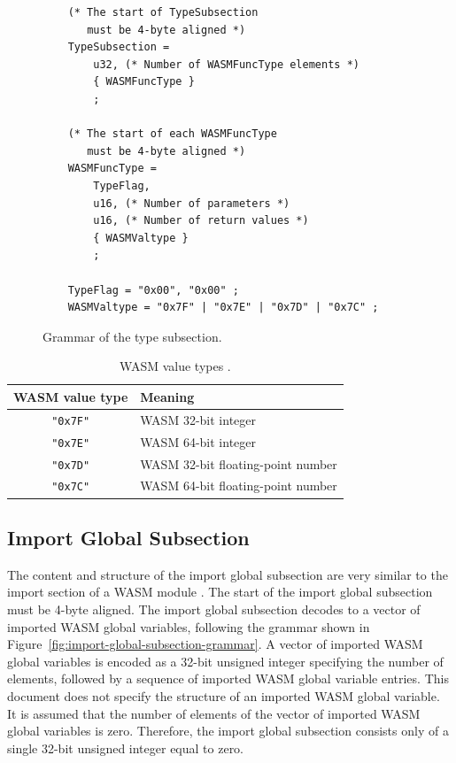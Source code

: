 \documentclass{article}
\begin{document}
\begin{figure}[H]
\begin{verbatim}
    (* The start of TypeSubsection
       must be 4-byte aligned *)
    TypeSubsection =
        u32, (* Number of WASMFuncType elements *)
        { WASMFuncType }
        ;

    (* The start of each WASMFuncType
       must be 4-byte aligned *)
    WASMFuncType =
        TypeFlag,
        u16, (* Number of parameters *)
        u16, (* Number of return values *)
        { WASMValtype }
        ;

    TypeFlag = "0x00", "0x00" ;
    WASMValtype = "0x7F" | "0x7E" | "0x7D" | "0x7C" ;
\end{verbatim}
\caption{Grammar of the type subsection.}
\label{fig:type-subsection-grammar}
\end{figure}

\begin{table}[H]
\centering
\begin{tabular}{cl}
    \hline
    WASM value type & Meaning \\
    \hline
    \verb|"0x7F"| & WASM 32-bit integer \\
    \verb|"0x7E"| & WASM 64-bit integer \\
    \verb|"0x7D"| & WASM 32-bit floating-point number \\
    \verb|"0x7C"| & WASM 64-bit floating-point number \\
    \hline
\end{tabular}
\caption{WASM value types \cite[Secs.~2.3.1 and 5.3.1]{webassembly2019core}.}
\label{table:wasm-value-types}
\end{table}

\subsection{Import Global Subsection}
The content and structure of the import global subsection are very similar to the import section of a WASM module \cite[Sec.~5.5.5]{webassembly2019core}.
The start of the import global subsection must be 4-byte aligned.
The import global subsection decodes to a vector of imported WASM global variables, following the grammar shown in Figure~\ref{fig:import-global-subsection-grammar}.
A vector of imported WASM global variables is encoded as a 32-bit unsigned integer specifying the number of elements, followed by a sequence of imported WASM global variable entries.
This document does not specify the structure of an imported WASM global variable.
It is assumed that the number of elements of the vector of imported WASM global variables is zero.
Therefore, the import global subsection consists only of a single 32-bit unsigned integer equal to zero.
\end{document}
